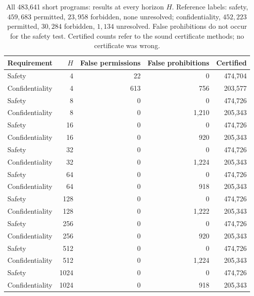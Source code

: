 \begin{table}[tbp]\centering\small
\caption{All 483,641 short programs: results at every horizon $H$. Reference labels: safety, $459{,}683$ permitted, $23{,}958$ forbidden, none unresolved; confidentiality, $452{,}223$ permitted, $30{,}284$ forbidden, $1{,}134$ unresolved. False prohibitions do not occur for the safety test. Certified counts refer to the sound certificate methods; no certificate was wrong.}
\label{tab:S1small}
\begin{tabular}{lrrrr}
\toprule
Requirement & $H$ & False permissions & False prohibitions & Certified\\
\midrule
Safety & 4 & 22 & 0 & 474,704\\
Confidentiality & 4 & 613 & 756 & 203,577\\
Safety & 8 & 0 & 0 & 474,726\\
Confidentiality & 8 & 0 & 1,210 & 205,343\\
Safety & 16 & 0 & 0 & 474,726\\
Confidentiality & 16 & 0 & 920 & 205,343\\
Safety & 32 & 0 & 0 & 474,726\\
Confidentiality & 32 & 0 & 1,224 & 205,343\\
Safety & 64 & 0 & 0 & 474,726\\
Confidentiality & 64 & 0 & 918 & 205,343\\
Safety & 128 & 0 & 0 & 474,726\\
Confidentiality & 128 & 0 & 1,222 & 205,343\\
Safety & 256 & 0 & 0 & 474,726\\
Confidentiality & 256 & 0 & 920 & 205,343\\
Safety & 512 & 0 & 0 & 474,726\\
Confidentiality & 512 & 0 & 1,224 & 205,343\\
Safety & 1024 & 0 & 0 & 474,726\\
Confidentiality & 1024 & 0 & 918 & 205,343\\
\bottomrule
\end{tabular}
\end{table}
